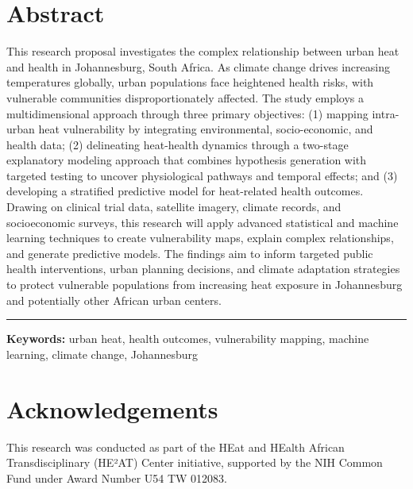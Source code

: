 \section*{Abstract}
This research proposal investigates the complex relationship between urban heat and health in Johannesburg, South Africa. As climate change drives increasing temperatures globally, urban populations face heightened health risks, with vulnerable communities disproportionately affected. 
The study employs a multidimensional approach through three primary objectives: (1) mapping intra-urban heat vulnerability by integrating environmental, socio-economic, and health data; (2) delineating heat-health dynamics through a two-stage explanatory modeling approach that combines hypothesis generation with targeted testing to uncover physiological pathways and temporal effects; and (3) developing a stratified predictive model for heat-related health outcomes.
Drawing on clinical trial data, satellite imagery, climate records, and socioeconomic surveys, this research will apply advanced statistical and machine learning techniques to create vulnerability maps, explain complex relationships, and generate predictive models. The findings aim to inform targeted public health interventions, urban planning decisions, and climate adaptation strategies to protect vulnerable populations from increasing heat exposure in Johannesburg and potentially other African urban centers.

\noindent\rule{\textwidth}{0.5pt}

\vspace{0.5cm}
\noindent\textbf{Keywords:} urban heat, health outcomes, vulnerability mapping, machine learning, climate change, Johannesburg

\section*{Acknowledgements}

This research was conducted as part of the HEat and HEalth African Transdisciplinary (HE²AT) Center initiative, supported by the NIH Common Fund under Award Number U54 TW 012083.